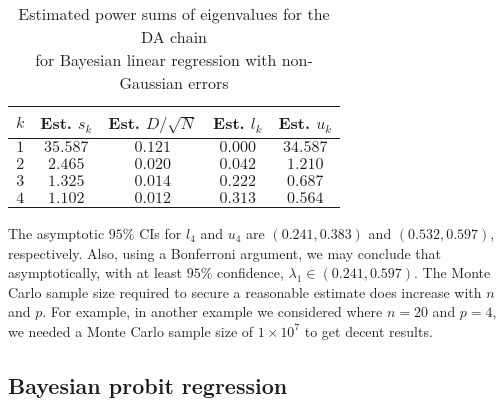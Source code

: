 \documentclass[11pt]{article}
\begin{document}
	\begin{table}[!h]
          \begin{center} \caption{Estimated power sums of eigenvalues for the DA chain\\ for Bayesian linear regression with non-Gaussian errors} \label{nongaussian2}
             \medskip
			\begin{tabular}{ccccc} 
				$k$ & Est. $s_k$ & Est. $D/\sqrt{N}$ & Est. $l_k$ & Est. $u_k$ \\ \hline
				$1$ & $35.587$ & $0.121$ & $0.000$ & $34.587$ \\
				$2$ & $2.465$ & $0.020$ & $0.042$ & $1.210$ \\
				$3$ & $1.325$ & $0.014$ & $0.222$ & $0.687$ \\
				$4$ & $1.102$ & $0.012$ & $0.313$ & $0.564$ \\
			\end{tabular}
		\end{center}
	\end{table}

        The asymptotic $95\%$ CIs for $l_4$ and $u_4$ are
        $(0.241,0.383)$ and $(0.532,0.597)$, respectively.  Also,
        using a Bonferroni argument, we may conclude that
        asymptotically, with at least $95\%$ confidence, $\lambda_1
        \in (0.241,0.597)$.  The Monte Carlo sample size required to
        secure a reasonable estimate does increase with $n$ and $p.$
        For example, in another example we considered where $n=20$ and
        $p=4,$ we needed a Monte Carlo sample size of $1 \times 10^7$
        to get decent results.
	
	\subsection{Bayesian probit regression}
	
\end{document}
